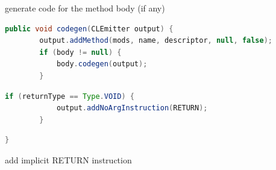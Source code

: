 \documentclass[8pt,a4paper,compress]{beamer}
\begin{document}
\begin{frame}[fragile]
\begin{overprint}
\begin{tcolorbox}[enhanced,drop shadow southwest,sharp corners,size=fbox,colback=white,fontlower=\small\ttfamily,collower=silver900]
\tcblower
\begin{minipage}[t][.25cm][t]{\textwidth}
generate code for the method body (if any)
\end{minipage}
\end{tcolorbox}

\begin{tcolorbox}[enhanced,drop shadow southwest,sharp corners,size=fbox,colback=white,fontlower=\small\ttfamily,collower=silver900]

\begin{lstlisting}[language=Java,style=focusout]
    public void codegen(CLEmitter output) {
        output.addMethod(mods, name, descriptor, null, false);
        if (body != null) {
            body.codegen(output);
        }
\end{lstlisting}
\begin{lstlisting}[language=Java,style=focusin,backgroundcolor=\color{lime100}]
        if (returnType == Type.VOID) {
            output.addNoArgInstruction(RETURN);
        }
\end{lstlisting}
\begin{lstlisting}[language=Java,style=focusout]
    }
\end{lstlisting}

\tcblower
\begin{minipage}[t][.25cm][t]{\textwidth}
add implicit RETURN instruction
\end{minipage}
\end{tcolorbox}
\end{overprint}
\end{frame}
\end{document}
